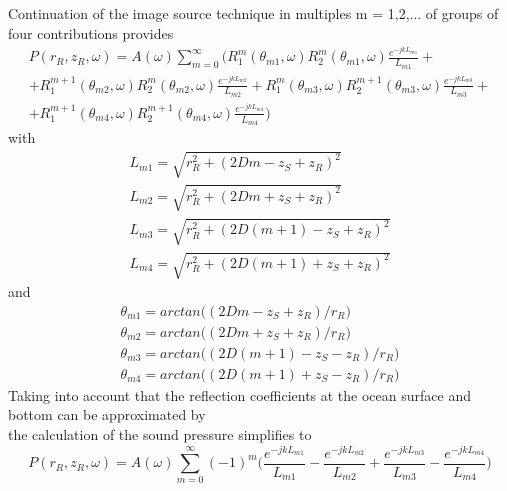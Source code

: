 \noindent Continuation of the image source technique in multiples m = 1,2,... of groups of four contributions provides
\begin{equation}
\begin{gathered} 
\textit{$P(r_R, z_R,\omega)$} = A(\omega)\sum_{m=0}^{\infty} \Bigg( R_{1}^{m}(\theta_{m1},\omega)  R_{2}^{m}(\theta_{m1},\omega)  \frac{e^{-jkL_{m1}}}{L_{m1}} + \\
 + R_{1}^{m+1}(\theta_{m2},\omega)  R_{2}^{m}(\theta_{m2},\omega)  \frac{e^{-jkL_{m2}}}{L_{m2}} +  R_{1}^{m}(\theta_{m3},\omega)  R_{2}^{m+1}(\theta_{m3},\omega)  \frac{e^{-jkL_{m3}}}{L_{m3}} + \\
 +  R_{1}^{m+1}(\theta_{m4},\omega)  R_{2}^{m+1}(\theta_{m4},\omega)  \frac{e^{-jkL_{m4}}}{L_{m4}} \Bigg)
\end{gathered}
\end{equation}
\noindent with
\begin{equation}
\begin{gathered} 
L_{m1}  = \sqrt{r_{R}^{2} + (2Dm - z_{S} + z_{R})^{2}} \\
L_{m2}  = \sqrt{r_{R}^{2} + (2Dm + z_{S} + z_{R})^{2}} \\
L_{m3}  = \sqrt{r_{R}^{2} + (2D(m+1) - z_{S} + z_{R})^{2}} \\
L_{m4}  = \sqrt{r_{R}^{2} + (2D(m+1) + z_{S} + z_{R})^{2}}
\end{gathered} 
\end{equation}
\noindent and
\begin{equation}
\begin{gathered} 
\theta_{m1}  = arctan \Big((2Dm - z_{S} + z_{R}) / r_{R} \Big) \\
\theta_{m2}  = arctan \Big((2Dm + z_{S} + z_{R}) / r_{R} \Big) \\
\theta_{m3}  = arctan \Big((2D(m+1 ) - z_{S} - z_{R}) / r_{R} \Big) \\
\theta_{m4}  = arctan \Big((2D(m+1 ) +  z_{S} - z_{R}) / r_{R} \Big)
\end{gathered} 
\end{equation}
\noindent Taking into account that the reflection coefficients at the ocean surface and bottom can be approximated by \\
\noindent the calculation of the sound pressure simplifies to
\begin{equation}
\textit{$P(r_R, z_R,\omega)$} = A(\omega)\sum_{m=0}^{\infty} (-1)^{m} \Bigg(  \frac{e^{-jkL_{m1}}}{L_{m1}} -
\frac{e^{-jkL_{m2}}}{L_{m2}} +  \frac{e^{-jkL_{m3}}}{L_{m3}} - \frac{e^{-jkL_{m4}}}{L_{m4}} \Bigg)
\end{equation}
